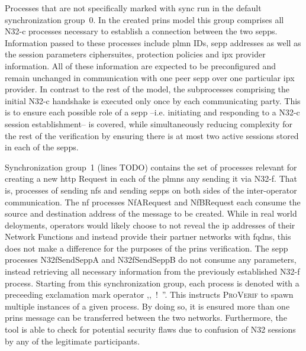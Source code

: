 Processes that are not specifically marked with {\sffamily sync} run in the default synchronization group~0.
In the created \gls{prins} model this group comprises all N32-c processes necessary to establish a connection between the two \glspl{sepp}.
Information passed to these processes include \gls{plmn} IDs, \gls{sepp} addresses as well as the session parameters ciphersuites, protection policies and \gls{ipx} provider information.
All of these information are expected to be preconfigured and remain unchanged in communication with one peer \gls{sepp} over one particular \gls{ipx} provider.
In contrast to the rest of the model, the subprocesses comprising the initial N32-c handshake is executed only once by each communicating party.
This is to ensure each possible role of a \gls{sepp} --i.e. initiating and responding to a N32-c session establishment-- is covered, while simultaneously reducing complexity for the rest of the verification by ensuring there is at most two active sessions stored in each of the \glspl{sepp}.

Synchronization group~1 (lines TODO) contains the set of processes relevant for creating a new \gls{http} Request in each of the \glspl{plmn} any sending it via N32-f.
That is, processes of sending \glspl{nf} and sending \glspl{sepp} on both sides of the inter-operator communication.
The \gls{nf} processes {\sffamily NfARequest} and {\sffamily NfBRequest} each consume the source and destination address of the message to be created.
While in real world deloyments, operators would likely choose to not reveal the \gls{ip} addresses of their Network Functions and instead provide their partner networks with \glspl{fqdn}, this does not make a difference for the purposes of the \gls{prins} verification.
The \gls{sepp} processes {\sffamily N32fSendSeppA} and {\sffamily N32fSendSeppB} do not consume any parameters, instead retrieving all necessary information from the previously established N32-f process.
Starting from this synchronization group, each process is denoted with a preceeding exclamation mark operator ,,~{\sffamily !}~''.
This instructs \textsc{ProVerif} to spawn multiple instances of a given process.
By doing so, it is ensured more than one \gls{prins} message can be transferred between the two networks.
Furthermore, the tool is able to check for potential security flaws due to confusion of N32 sessions by any of the legitimate participants.

